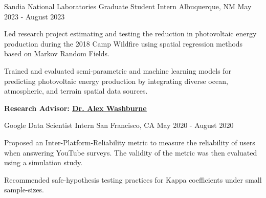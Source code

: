 
\begin{cventries}


  \cventry
    {Sandia National Laboratories} %
    {Graduate Student Intern} %
    {Albuquerque, NM} %
    {May 2023 - August 2023} %
    {
      \begin{cvitems} %
        \item Led research project estimating and testing the reduction in photovoltaic energy production during the 2018 Camp Wildfire \newline using spatial regression methods  based on Markov Random Fields.
        \item Trained and evaluated semi-parametric and machine learning models for predicting photovoltaic energy production by \newline integrating diverse ocean, atmospheric, and terrain spatial data sources.
        \item  \textbf{ Research Advisor:
\href{https://www.alexwashburne.com/}{\underline{Dr. Alex Washburne}}
}
      \end{cvitems}
    }
    
  \cventry
    {Google } %
    {Data Scientist Intern} %
    {San Francisco, CA} %
    {May 2020 - August 2020} %
    {
      \begin{cvitems} %
\item Proposed an Inter-Platform-Reliability metric to measure the reliability of users when answering YouTube surveys. \newline The validity of the metric was then evaluated using a simulation study.
\item Recommended safe-hypothesis testing practices for Kappa coefficients under small sample-sizes.
      \end{cvitems}
    }


\end{cventries}
